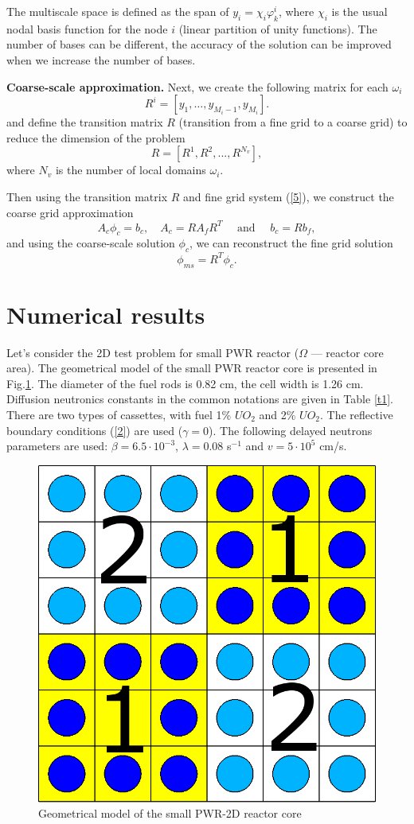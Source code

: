 \documentclass[10pt]{article}
\begin{document}
The multiscale space is defined as the span of $y_i = \chi_i \varphi^i_k$, where $\chi_i$ is the usual nodal basis function for the node $i$ (linear partition of unity functions). 
The number of bases can be different, the accuracy of the solution can be improved when we increase the number of bases.

\textbf{Coarse-scale approximation. }
Next, we create the following  matrix for each $\omega_i$
\[
R^i = \left[ y_1, \ldots, y_{M_i-1},  y_{M_i} \right].
\]
and define the transition matrix $R$ (transition from a fine grid to a coarse grid) to reduce the dimension of the problem
\[
R = [ R^1, R^2, ..., R^{N_v} ],
\]
where $N_v$ is the number of local domains $\omega_i$.

Then using the transition matrix $R$ and fine grid system (\ref{5}), we construct the coarse grid approximation
\begin{equation}\label{9}
A_c \phi_c = b_c, \quad 
A_c = R A_f R^T 
\quad \text{ and } \quad 
b_c = R b_f,
\end{equation}  
and using the coarse-scale solution $\phi_c$, we can  reconstruct the fine grid solution 
\[
\phi_{ms} = R^T \phi_c.
\]

\section{Numerical results}
Let's consider the 2D test problem for small PWR reactor ($\Omega$ --- reactor core area). 
The geometrical model of the small PWR reactor core is presented in Fig.\ref{p3}. 
The diameter of the fuel rods is 0.82 cm, the cell width is 1.26 cm.
Diffusion neutronics constants in the common notations are given in Table \ref{t1}. 
There are two types of cassettes, with fuel 1\% $UO_2$ and 2\% $UO_2$.
The reflective boundary conditions (\ref{2}) are used ($\gamma = 0$).
The following delayed neutrons parameters are used: $\beta = 6.5 \cdot 10^{-3}$, $\lambda = 0.08$ s$^{-1}$ and $v = 5 \cdot 10^5$ cm/s.

\begin{figure}[h]
  \begin{center}
    \includegraphics[width=0.5\linewidth] {smallpwr.png}
	\caption{Geometrical model of the small PWR-2D reactor core}
	\label{p3}
  \end{center}
\end{figure} 
\end{document}
